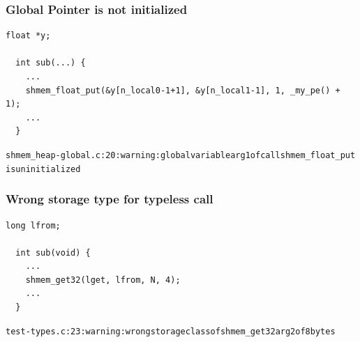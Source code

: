 \begin{minipage}{\linewidth}
\subsubsection{Global Pointer is not initialized}

\begin{lstlisting}[language=OSH+C]
  float *y;

  int sub(...) {
    ...
    shmem_float_put(&y[n_local0-1+1], &y[n_local1-1], 1, _my_pe() + 1);
    ...
  }
\end{lstlisting}
\begin{alltt}
  shmem_heap-global.c:20: warning: global variable arg1 of call shmem_float_put
  is uninitialized
\end{alltt}
\end{minipage}

\begin{minipage}{\linewidth}
\subsubsection{Wrong storage type for typeless \openshmem call}

\begin{lstlisting}[language=OSH+C]
  long lfrom;

  int sub(void) {
    ...
    shmem_get32(lget, lfrom, N, 4);
    ...
  }
\end{lstlisting}
\begin{alltt}
  test-types.c:23: warning: wrong storage class of shmem_get32 arg2 of 8 bytes
\end{alltt}
\end{minipage}

% 
